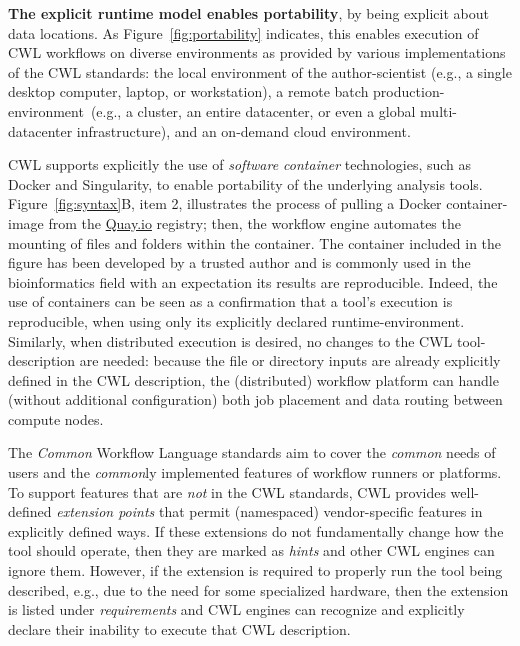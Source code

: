 \documentclass[sigconf,revew,screen,timestamp,nonacm]{acmart}
\begin{document}
\textbf{The explicit runtime model enables portability}, by being explicit about data locations. As Figure~\ref{fig:portability} indicates, this enables execution of CWL workflows on diverse environments as provided by various implementations of the CWL standards: the local environment of the author-scientist (e.g., a single desktop computer, laptop, or workstation), a remote batch production-environment~(e.g., a cluster, an entire datacenter, or even a global multi-datacenter infrastructure), and an on-demand cloud environment.

CWL supports explicitly the use of \textit{software container} technologies, such as Docker and Singularity, to enable portability of the underlying analysis tools. Figure~\ref{fig:syntax}B, item 2, illustrates the process of pulling a Docker container-image from the \url{Quay.io} registry; then, the workflow engine automates the mounting of files and folders within the container. The container included in the figure has been developed by a trusted author and is commonly used in the bioinformatics field with an expectation its results are reproducible. Indeed, the use of containers can be seen as a confirmation that a tool’s execution is reproducible, when using only its explicitly declared runtime-environment. Similarly, when distributed execution is desired, no changes to the CWL tool-description are needed: because the file or directory inputs are already explicitly defined in the CWL description, the (distributed) workflow platform can handle (without additional configuration) both job placement and data routing between compute nodes.

The \textit{Common} Workflow Language standards aim to cover the \textit{common} needs of users and the \textit{common}ly implemented features of workflow runners or platforms. To support features that are \textit{not} in the CWL standards, CWL provides well-defined \textit{extension points} that permit (namespaced) vendor-specific features in explicitly defined ways. If these extensions do not fundamentally change how the tool should operate, then they are marked as \textit{hints} and other CWL engines can ignore them. However, if the extension is required to properly run the tool being described, e.g., due to the need for some specialized hardware, then the extension is listed under \textit{requirements} and CWL engines can recognize and explicitly declare their inability to execute that CWL description.
\end{document}
